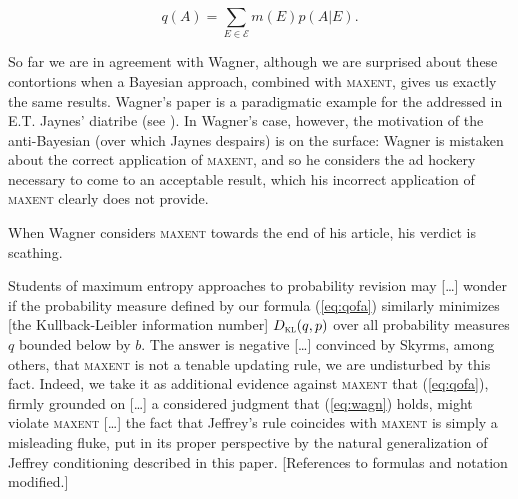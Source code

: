\documentclass[11pt]{article}
\begin{document}
\begin{equation}
  \label{eq:qofa}
  q(A)=\sum_{E\in\mathcal{E}}m(E)p(A|E).
\end{equation}

So far we are in agreement with Wagner, although we are surprised
about these contortions when a Bayesian approach, combined with
\textsc{maxent}, gives us exactly the same results. Wagner's paper is
a paradigmatic example for the 
addressed in E.T. Jaynes' diatribe (see ). In
Wagner's case, however, the motivation of the anti-Bayesian (over
which Jaynes despairs) is on the surface: Wagner is mistaken about the
correct application of \textsc{maxent}, and so he considers the ad
hockery necessary to come to an acceptable result, which his incorrect
application of \textsc{maxent} clearly does not provide.

When Wagner considers \textsc{maxent} towards the end
of his article, his verdict is scathing. 

\begin{quotex}
  Students of maximum entropy approaches to probability revision may
  [\ldots] wonder if the probability measure defined by our formula
  (\ref{eq:qofa}) similarly minimizes [the Kullback-Leibler
  information number] $D_{\textsc{kl}}(q,p)$ over all probability
  measures $q$ bounded below by $b$. The answer is negative [\ldots]
  convinced by Skyrms, among others, that \textsc{maxent} is not a
  tenable updating rule, we are undisturbed by this fact. Indeed, we
  take it as additional evidence against \textsc{maxent} that
  (\ref{eq:qofa}), firmly grounded on [\ldots] a considered judgment
  that (\ref{eq:wagn}) holds, might violate \textsc{maxent} [\ldots]
  the fact that Jeffrey's rule coincides with \textsc{maxent} is
  simply a misleading fluke, put in its proper perspective by the
  natural generalization of Jeffrey conditioning described in
  this paper. [References to formulas and notation modified.]
\end{quotex}
\end{document}
